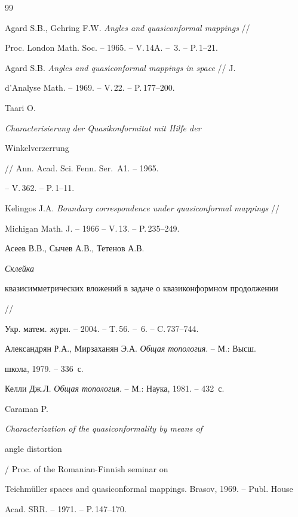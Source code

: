 \begin{thebibliography}{99}







Agard S.B., Gehring F.W. {\em Angles and quasiconformal mappings} // 


Proc. London Math. Soc. -- 1965. -- V.\,14A. -- \No\,3. -- P.\,1--21.




Agard S.B. {\em Angles and quasiconformal mappings in space} // J. 


d'Analyse Math. -- 1969. -- V.\,22. -- P.\,177--200.




Taari O. {\em Characterisierung der Quasikonformitat mit Hilfe der 


Winkelverzerrung} // Ann. Acad. Sci. Fenn. Ser.~A1. -- 1965.


-- V.\,362. -- P.\,1--11. 




Kelingos J.A. {\em Boundary correspondence under quasiconformal mappings} // 


Michigan Math. J. -- 1966 -- V.\,13. -- P.\,235--249.




Асеев В.В., Сычев А.В., Тетенов А.В. {\em Склейка 


квазисимметрических вложений в задаче о квазиконформном продолжении} //  


Укр. матем. журн. -- 2004. -- T.\,56. -- \No\,6. -- C.\,737--744.




Александрян Р.А., Мирзаханян Э.А. {\em Общая топология}. -- М.: Высш. 


школа, 1979. -- 336~с.




Келли Дж.Л. {\em Общая топология}. -- М.: Наука, 1981. -- 432~с.




Caraman P. {\em Characterization of the quasiconformality by means of 


angle distortion} / Proc. of the Romanian-Finnish seminar on 


Teichm\"uller spaces and quasiconformal mappings. Brasov, 1969. -- Publ. House 


Acad. SRR. -- 1971. -- P.\,147--170.





\end{thebibliography}

